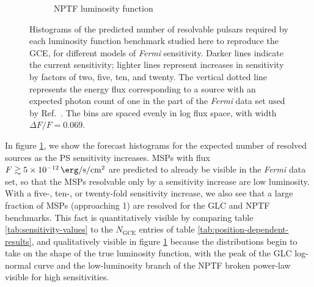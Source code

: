 \documentclass[letter,11pt]{article}
\begin{document}
\begin{figure}
\begin{subfigure}[b]{0.49\textwidth}
        \caption{NPTF luminosity function}
    \end{subfigure}
    \caption{Histograms of the predicted number of resolvable pulsars required by each luminosity function benchmark studied here to reproduce the GCE, for different models of \textit{Fermi} sensitivity. Darker lines indicate the current sensitivity; lighter lines represent increases in sensitivity by factors of two, five, ten, and twenty. The vertical dotted line represents the energy flux corresponding to a source with an expected photon count of one in the part of the \textit{Fermi} data set used by Ref.~\cite{List:2021aer}. The bins are spaced evenly in log flux space, with width $\Delta F / F = 0.069$.}
    \label{fig:sensitivity-results}
\end{figure}

In figure \ref{fig:sensitivity-results}, we show the forecast histograms for the expected number of resolved sources as the PS sensitivity increases. MSPs with flux $F \gtrsim \SI{5e-12}{\erg\per\second\per\centi\meter\squared}$ are predicted to already be visible in the \textit{Fermi} data set, so that the MSPs resolvable only by a sensitivity increase are low luminosity. With a five-, ten-, or twenty-fold sensitivity increase, we also see that a large fraction of MSPs (approaching 1) are resolved for the GLC and NPTF benchmarks. This fact is quantitatively visible by comparing table \ref{tab:sensitivity-values} to the $N_\text{GCE}$ entries of table \ref{tab:position-dependent-results}, and qualitatively visible in figure \ref{fig:sensitivity-results} because the distributions begin to take on the shape of the true luminosity function, with the peak of the GLC log-normal curve and the low-luminosity branch of the NPTF broken power-law visible for high sensitivities.
\end{document}
